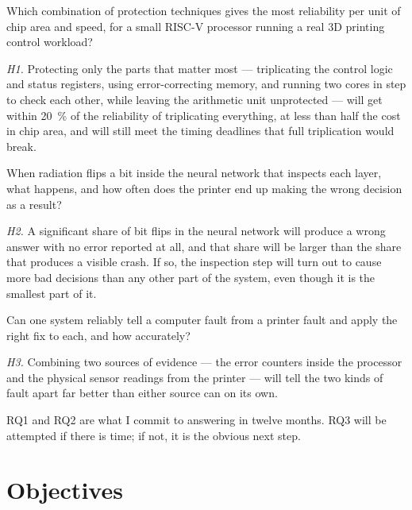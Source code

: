 \documentclass[11pt,a4paper]{article}
\begin{document}
\begin{description}[leftmargin=1.5cm,style=nextline,font=\bfseries]

\item[RQ1.] Which combination of protection techniques gives the most
reliability per unit of chip area and speed, for a small RISC-V processor running
a real 3D printing control workload?

\emph{H1.} Protecting only the parts that matter most --- triplicating the
control logic and status registers, using error-correcting memory, and running two
cores in step to check each other, while leaving the arithmetic unit unprotected
--- will get within \SI{20}{\percent} of the reliability of triplicating
everything, at less than half the cost in chip area, and will still meet the
timing deadlines that full triplication would break.

\item[RQ2.] When radiation flips a bit inside the neural network that inspects
each layer, what happens, and how often does the printer end up making the wrong
decision as a result?

\emph{H2.} A significant share of bit flips in the neural network will produce a
wrong answer with no error reported at all, and that share will be larger than the
share that produces a visible crash. If so, the inspection step will turn out to
cause more bad decisions than any other part of the system, even though it is the
smallest part of it.

\item[RQ3.] Can one system reliably tell a computer fault from a printer fault
and apply the right fix to each, and how accurately?

\emph{H3.} Combining two sources of evidence --- the error counters inside the
processor and the physical sensor readings from the printer --- will tell the two
kinds of fault apart far better than either source can on its own.

\end{description}

RQ1 and RQ2 are what I commit to answering in twelve months. RQ3 will be attempted
if there is time; if not, it is the obvious next step.

\section{Objectives}
\end{document}
